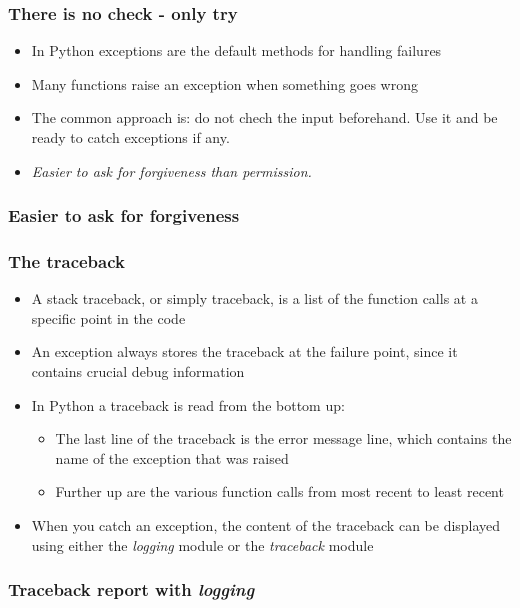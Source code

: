 \documentclass[9pt]{beamer}
\begin{document}
\begin{frame}
  \frametitle{There is no check - only try}
  \begin{itemize}
    \item In Python exceptions are the default methods for handling failures
    \smallskip
    \item Many functions raise an exception when something goes wrong
    \smallskip
    \item The common approach is: do not chech the input beforehand. Use it and
          be ready to catch exceptions if any.
    \smallskip
    \item \textit{Easier to ask for forgiveness than permission.} 
  \end{itemize}
\end{frame}


\begin{frame}
  \frametitle{Easier to ask for forgiveness}
  
\end{frame}


\begin{frame}
  \frametitle{The traceback}
  \begin{itemize}
    \item A \alert{stack traceback}, or simply traceback, is a list of the
          function calls at a specific point in the code
    \smallskip
    \item An exception always stores the traceback at the failure point, since
          it contains crucial debug information 
    \smallskip
    \item In Python a traceback is read from the bottom up:
    \begin{itemize}
    \smallskip
    \item The last line of the traceback is the error message line, which
          contains the name of the exception that was raised
    \smallskip
    \item Further up are the various function calls from most
          recent to least recent
    \end{itemize}
    \medskip
    \item When you catch an exception, the content of the traceback can be
          displayed using either the \emph{logging} module or the
          \emph{traceback} module
  \end{itemize}
\end{frame}


\begin{frame}
  \frametitle{Traceback report with \emph{logging}}
  
\end{frame}
\end{document}
